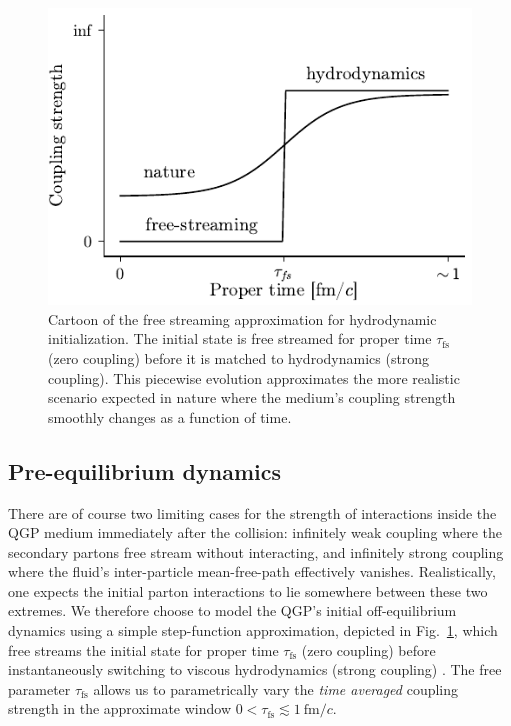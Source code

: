 \documentclass[aps,prc,reprint,amsmath,nofootinbib]{revtex4-1}
\newcommand{\fmc}{\ensuremath{\text{fm}/c}}
\newcommand{\taufs}{\tau_\text{fs}}
\begin{document}
\begin{figure}
  \includegraphics{coupling}
  \caption{Cartoon of the free streaming approximation for hydrodynamic initialization. The initial state is free streamed for proper time $\taufs$ (zero coupling) before it is matched to hydrodynamics (strong coupling). This piecewise evolution approximates the more realistic scenario expected in nature where the medium's coupling strength smoothly changes as a function of time.}
  \label{fig:coupling}
\end{figure}

\subsection{Pre-equilibrium dynamics}

There are of course two limiting cases for the strength of interactions inside the QGP medium immediately after the collision: infinitely weak coupling where the secondary partons free stream without interacting, and infinitely strong coupling where the fluid's inter-particle mean-free-path effectively vanishes.
Realistically, one expects the initial parton interactions to lie somewhere between these two extremes.
We therefore choose to model the QGP's initial off-equilibrium dynamics using a simple step-function approximation, depicted in Fig.~\ref{fig:coupling}, which free streams the initial state for proper time $\taufs$ (zero coupling) before instantaneously switching to viscous hydrodynamics (strong coupling) \cite{Liu:2015nwa, Broniowski:2008qk}.
The free parameter $\taufs$ allows us to parametrically vary the \emph{time averaged} coupling strength in the approximate window $0 < \taufs \lesssim1\ \fmc$.
\end{document}

